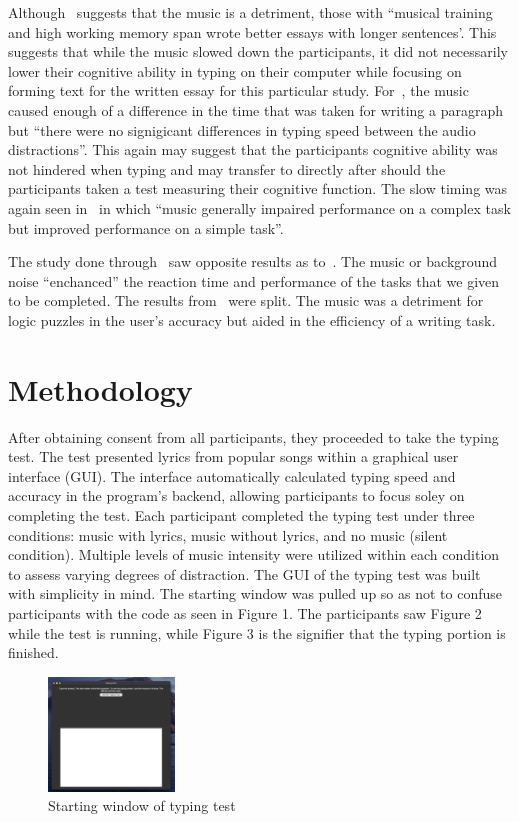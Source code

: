 \documentclass[manuscript, screen, review]{acmart} %
\begin{document}
Although~\cite{ransdell2001141} suggests that the music is a detriment, those with ``musical training and high working memory span wrote better essays with longer sentences'. This suggests that while the music slowed down the participants, it did not necessarily lower their cognitive ability in typing on their computer while focusing on forming text for the written essay for this particular study. For~\cite{AudioDistractionsAshley}, the music caused enough of a difference in the time that was taken for writing a paragraph but ``there were no signigicant differences in typing speed between the audio distractions''. This again may suggest that the participants cognitive ability was not hindered when typing and may transfer to directly after should the participants taken a test measuring their cognitive function. The slow timing was again seen in~\cite{Gonzalez_Aiello_2019} in which ``music generally impaired performance on a complex task but improved performance on a simple task''. 

The study done through~\cite{kiss2021effect} saw opposite results as to~\cite{Gonzalez_Aiello_2019}. The music or background noise ``enchanced'' the reaction time and performance of the tasks that we given to be completed. The results from~\cite{mathew2022inherently} were split. The music was a detriment for logic puzzles in the user's accuracy but aided in the efficiency of a writing task. 

\section{Methodology}
  After obtaining consent from all participants, they proceeded to take the typing test. The test presented lyrics from popular songs within a graphical user interface (GUI). 
  The interface automatically calculated typing speed and accuracy in the program's backend, allowing participants to focus soley on completing the test.
  Each participant completed the typing test under three conditions: music with lyrics, music without lyrics, and no music (silent condition).
  Multiple levels of music intensity were utilized within each condition to assess varying degrees of distraction.
  The GUI of the typing test was built with simplicity in mind. The starting window was pulled up so as not to confuse participants with the code as seen in Figure 1. The participants saw Figure 2 while the test is running, while Figure 3 is the signifier that the typing portion is finished. 

  \begin{figure}
    \includegraphics[width=0.3\textwidth]{typing_test_1}
    \caption{Starting window of typing test}
  \end{figure}
\end{document}
